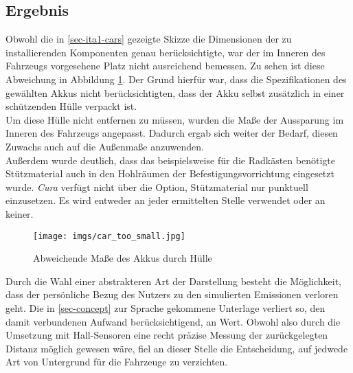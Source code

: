 \documentclass[.../Dokumentation.tex]{subfiles}
\begin{document}
\subsection{Ergebnis}\label{sec-ita1-result}
Obwohl die in \ref{sec-ita1-cars} gezeigte Skizze die Dimensionen der zu 
installierenden Komponenten genau berücksichtigte, war der im Inneren des 
Fahrzeugs vorgesehene Platz nicht ausreichend bemessen.
Zu sehen ist diese Abweichung in Abbildung \ref{fig-car-too-small}.
Der Grund hierfür war, dass die Spezifikationen des gewählten Akkus nicht 
berücksichtigten, dass der Akku selbst zusätzlich in einer schützenden Hülle 
verpackt ist.\\
Um diese Hülle nicht entfernen zu müssen, wurden die 
Maße der Aussparung im Inneren des Fahrzeugs angepasst. Dadurch ergab 
sich weiter der Bedarf, diesen Zuwachs auch auf die Außenmaße anzuwenden.\\
Außerdem wurde deutlich, dass das beispielsweise für die Radkästen benötigte 
Stützmaterial auch in den Hohlräumen der Befestigungsvorrichtung 
eingesetzt wurde. \textit{Cura} verfügt nicht über die Option, Stützmaterial nur 
punktuell einzusetzen. Es wird entweder an jeder ermittelten Stelle verwendet 
oder an keiner. 
\begin{figure}[H]
    \begin{center}
    \texttt{[image: imgs/car\_too\_small.jpg]}
    \caption{Abweichende Maße des Akkus durch Hülle}
    \label{fig-car-too-small}
    \end{center}
\end{figure}
\noindent
Durch die Wahl einer abstrakteren Art der Darstellung besteht die Möglichkeit, 
dass der persönliche Bezug des Nutzers zu den simulierten Emissionen verloren 
geht.
Die in \ref{sec-concept} zur Sprache gekommene Unterlage verliert so, den damit 
verbundenen Aufwand berücksichtigend, an Wert.
Obwohl also durch die Umsetzung mit Hall-Sensoren 
eine recht präzise Messung der zurückgelegten Distanz möglich gewesen wäre, 
fiel an dieser Stelle die Entscheidung, auf jedwede Art von Untergrund 
für die Fahrzeuge zu verzichten.
\end{document}
